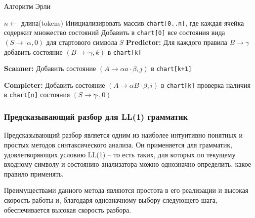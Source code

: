 \documentclass[14pt, russian]{scrartcl}
\begin{document}
\begin{listing}[H]
	\caption{Алгоритм Эрли}
	\label{lst:earley}
\begin{algorithm}[H]
	\begin{algorithmic}[1]
	  \State $n \gets$ длина(tokens)
	  \State Инициализировать массив \texttt{chart[0..n]}, где каждая ячейка содержит множество состояний
	  \State Добавить в \texttt{chart[0]} все состояния вида $(S \to \cdot \alpha, 0)$ для стартового символа $S$
		\Repeat
			  \State \textbf{Predictor:} Для каждого правила $B \to \gamma$ добавить состояние $(B \to \cdot \gamma, k)$ в \texttt{chart[k]}
			\EndIf
		  \EndFor

			\State \textbf{Scanner:} Добавить состояние $(A \to \alpha a \cdot \beta, j)$ в \texttt{chart[k+1]}
		  \EndIf
		\EndFor

		\Repeat
			  \State \textbf{Completer:} Добавить состояние $(A \to \alpha B \cdot \beta, i)$ в \texttt{chart[k]}
			\EndFor
		  \EndFor
	  \EndFor
	  \State \Return проверка наличия в \texttt{chart[n]} состояния $(S \to \gamma \cdot, 0)$
	\EndProcedure
	\end{algorithmic}
	\end{algorithm}
\end{listing}


\subsubsection{Предсказывающий разбор для LL(1) грамматик}

\label{sec:ll1int}

Предсказывающий разбор является одним из наиболее интуитивно понятных и простых методов синтаксического анализа.
Он применяется для грамматик, удовлетворяющих условию LL(1) – то есть таких, для которых по текущему входному
символу и состоянию анализатора можно однозначно определить, какое правило применять.

Преимуществами данного метода являются простота в его реализации и высокая скорость работы и, благодаря
однозначному выбору следующего шага, обеспечивается высокая скорость разбора.
\end{document}
